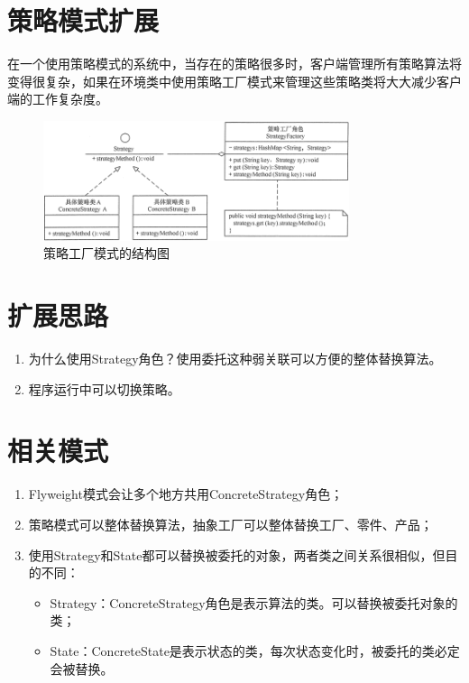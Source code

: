 \section{策略模式扩展}
在一个使用策略模式的系统中，当存在的策略很多时，客户端管理所有策略算法将变得很复杂，如果在环境类中使用策略工厂模式来管理这些策略类将大大减少客户端的工作复杂度。
\begin{figure}[!h]
	\centering
	\includegraphics[width=0.8\textwidth]{image/10-2}
	\caption{策略工厂模式的结构图}
\end{figure}
\section{扩展思路}
\begin{enumerate}
	\item 为什么使用Strategy角色？使用委托这种弱关联可以方便的整体替换算法。
	\item 程序运行中可以切换策略。
\end{enumerate}
\section{相关模式}
\begin{enumerate}
	\item Flyweight模式会让多个地方共用ConcreteStrategy角色；
	\item 策略模式可以整体替换算法，抽象工厂可以整体替换工厂、零件、产品；
	\item 使用Strategy和State都可以替换被委托的对象，两者类之间关系很相似，但目的不同：
	\begin{itemize}
		\item Strategy：ConcreteStrategy角色是表示算法的类。可以替换被委托对象的类；
		\item State：ConcreteState是表示状态的类，每次状态变化时，被委托的类必定会被替换。
	\end{itemize}
\end{enumerate}